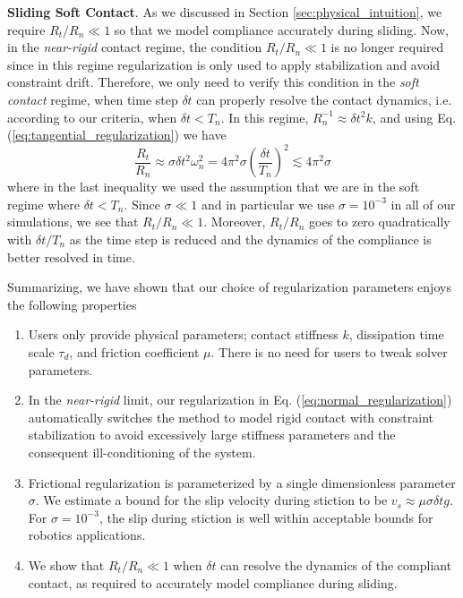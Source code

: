 \textbf{Sliding Soft Contact}. As we discussed in Section
\ref{sec:physical_intuition}, we require $R_t/R_n\ll 1$ so that we model
compliance accurately during sliding. Now, in the \emph{near-rigid} contact
regime, the condition $R_t/R_n\ll 1$ is no longer required since in this regime
regularization is only used to apply stabilization and avoid constraint drift.
Therefore, we only need to verify this condition in the \emph{soft contact}
regime, when time step $\delta t$ can properly resolve the contact dynamics,
i.e. according to our criteria, when $\delta t < T_n$. In this regime,
$R_n^{-1}\approx \delta t^2k$, and using Eq.
(\ref{eq:tangential_regularization}) we have
\begin{equation*}
    \frac{R_t}{R_n}\approx \sigma \delta t^2 \omega_n^2=4\pi^2\sigma\left(\frac{\delta t}{T_n}\right)^2
    \lesssim 4\pi^2\sigma
\end{equation*}
where in the last inequality we used the assumption that we are in the soft
regime where $\delta t < T_n$. Since $\sigma \ll 1$ and in particular we use
$\sigma=10^{-3}$ in all of our simulations, we see that $R_t/R_n \ll 1$.
Moreover, $R_t/R_n$ goes to zero quadratically with $\delta t/T_n$ as the time
step is reduced and the dynamics of the compliance is better resolved in time.

Summarizing, we have shown that our choice of regularization parameters enjoys
the following properties
\begin{enumerate}
    \item Users only provide physical parameters; contact stiffness $k$,
    dissipation time scale $\tau_d$, and friction coefficient $\mu$. There is no
    need for users to tweak solver parameters.
    \item In the \emph{near-rigid} limit, our regularization in Eq.
    (\ref{eq:normal_regularization}) automatically switches the method to model
    rigid contact with constraint stabilization to avoid excessively large
    stiffness parameters and the consequent ill-conditioning of the system.
    \item Frictional regularization is parameterized by a single dimensionless
    parameter $\sigma$. We estimate a bound for the slip velocity during
    stiction to be $v_s \approx \mu \sigma \delta t g$. For $\sigma=10^{-3}$,
    the slip during stiction is well within acceptable bounds for robotics
    applications.
    \item We show that $R_t/R_n \ll 1$ when $\delta t$ can resolve the dynamics
    of the compliant contact, as required to accurately model compliance during
    sliding.
\end{enumerate}
